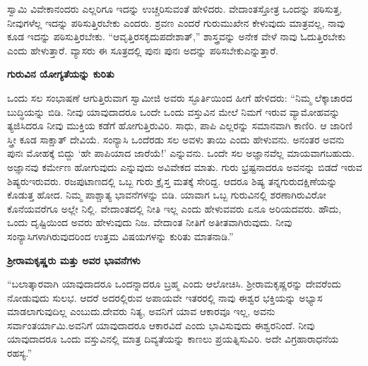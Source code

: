 ಸ್ವಾಮಿ ವಿವೇಕಾನಂದರು ಎಲ್ಲರಿಗೂ ಇದನ್ನು ಉಚ್ಚರಿಸುವಂತೆ ಹೇಳಿದರು. ವೇದಾಂತಸ್ತೋತ್ರ ಒಂದನ್ನು ಪಠಿಸುತ್ತ, ನೀವುಗಳೆಲ್ಲ ಇದನ್ನು ಪಠಿಸುತ್ತಿರಬೇಕು ಎಂದರು. ಶ್ರವಣ ಎಂದರೆ ಗುರುಮುಖೇನ ಕೇಳುವುದು ಮಾತ್ರವಲ್ಲ, ನಾವು ಕೂಡ ಇದನ್ನು ಪಠಿಸುತ್ತಿರಬೇಕು. “ಆವೃತ್ತಿರಸಕೃದುಪದೇಶಾತ್​,” ಶಾಸ್ತ್ರವನ್ನು ಅನೇಕ ವೇಳೆ ನಾವು ಓದುತ್ತಿರಬೇಕು ಎಂದು ಹೇಳುತ್ತಾರೆ. ವ್ಯಾಸರು ಈ ಸೂತ್ರದಲ್ಲಿ ಪುನಃ ಪುನಃ ಅದನ್ನು ಪಠಿಸಬೇಕು\break ಎನ್ನುತ್ತಾರೆ.

\centerline{\textbf{ಗುರುವಿನ ಯೋಗ್ಯತೆಯನ್ನು ಕುರಿತು}}

ಒಂದು ಸಲ ಸಂಭಾಷಣೆ ಆಗುತ್ತಿರುವಾಗ ಸ್ವಾಮೀಜಿ ಅವರು ಸ್ಫೂರ್ತಿಯಿಂದ ಹೀಗೆ ಹೇಳಿದರು: “ನಿಮ್ಮ ಲೆಕ್ಕಾಚಾರದ ಬುದ್ಧಿಯನ್ನು ಬಿಡಿ. ನೀವು ಯಾವುದಾದರೂ ಒಂದೇ ಒಂದು ವಸ್ತುವಿನ ಮೇಲೆ ನಿಮಗೆ ಇರುವ ವ್ಯಾಮೋಹವನ್ನು ತ್ಯಜಿಸಿದರೂ ನೀವು ಮುಕ್ತಿಯ ಕಡೆಗೆ ಹೋಗುತ್ತಿರುವಿರಿ. ಸಾಧು, ಪಾಪಿ ಎಲ್ಲರನ್ನು ಸಮಾನವಾಗಿ ಕಾಣಿರಿ. ಆ ಜಾರಿಣಿ ಸ್ತ್ರೀ ಕೂಡ ಸಾಕ್ಷಾತ್​ ದೇವಿಯೆ. ಸಂನ್ಯಾಸಿ ಒಂದೆರಡು ಸಲ ಅವಳು ತಾಯಿ ಎಂದು ಹೇಳುವನು. ಅನಂತರ ಅವನು ಪುನಃ ಮೋಹಕ್ಕೆ ಬಿದ್ದು ‘ಹೇ ಪಾಪಿಯಾದ ಜಾರೆಯೆ!’ ಎನ್ನುವನು. ಒಂದೇ ಸಲ ಅಜ್ಞಾನವೆಲ್ಲ ಮಾಯವಾಗಬಹುದು. ಅಜ್ಞಾನವು ಕರ್ಮೇಣ ಹೋಗುವುದು ಎನ್ನುವುದು ಅವಿವೇಕದ ಮಾತು. ಗುರು ಭ್ರಷ್ಟನಾದರೂ ಅವನನ್ನು ಬಿಡದೆ ಇರುವ ಶಿಷ್ಯರು\break ಇರುವರು. ರಜಪುಟಾಣದಲ್ಲಿ ಒಬ್ಬ ಗುರು ಕ್ರೈಸ್ತ ಮತಕ್ಕೆ ಸೇರಿದ್ದ. ಆದರೂ ಶಿಷ್ಯ ತನ್ನ\break ಗುರುದಕ್ಷಿಣೆಯನ್ನು ಕೊಡುತ್ತ ಹೋದ. ನಿಮ್ಮ ಪಾಶ್ಚಾತ್ಯ ಭಾವನೆಗಳನ್ನು ಬಿಡಿ. ಯಾವಾಗ ಒಬ್ಬ ಗುರುವಿನಲ್ಲಿ ಶರಣಾಗಿರುವಿರೋ ಕೊನೆಯವರೆಗೂ ಅಲ್ಲೇ ನಿಲ್ಲಿ. ವೇದಾಂತದಲ್ಲಿ ನೀತಿ ಇಲ್ಲ ಎಂದು ಹೇಳುವವರು ಏನೂ ಅರಿಯದವರು. ಹೌದು, ಒಂದು ದೃಷ್ಟಿಯಿಂದ ಅವರು ಹೇಳುವುದು ನಿಜ. ವೇದಾಂತ ನೀತಿಗೆ ಅತೀತವಾಗಿರುವುದು. ನೀವು ಸಂನ್ಯಾಸಿಗಳಾಗಿರುವುದರಿಂದ ಉತ್ತಮ ವಿಷಯಗಳನ್ನು ಕುರಿತು ಮಾತನಾಡಿ.”

\vskip 5pt

\centerline{\textbf{ಶ‍್ರೀರಾಮಕೃಷ್ಣರು ಮತ್ತು ಅವರ ಭಾವನೆಗಳು}}

\vskip 5pt

“ಬಲಾತ್ಕಾರವಾಗಿ ಯಾವುದಾದರೂ ಒಂದನ್ನಾದರೂ ಬ್ರಹ್ಮ ಎಂದು ಆಲೋಚಿಸಿ. ಶ‍್ರೀರಾಮಕೃಷ್ಣರನ್ನು ದೇವರೆಂದು ನೋಡುವುದು ಸುಲಭ. ಆದರೆ ಅದರಲ್ಲಿರುವ ಅಪಾಯವೇ ಇತರರಲ್ಲಿ ನಾವು ಈಶ್ವರ ಭಕ್ತಿಯನ್ನು ಅಭ್ಯಾಸ ಮಾಡಲಾಗುವುದಿಲ್ಲ ಎಂಬುದು.\break ದೇವರು ನಿತ್ಯ, ಅವನಿಗೆ ಯಾವ ಆಕಾರವೂ ಇಲ್ಲ, ಅವನು ಸರ್ವಾಂತರ್ಯಾಮಿ.\break ಅವನಿಗೆ ಯಾವುದಾದರೂ ಆಕಾರವಿದೆ ಎಂದು ಭಾವಿಸುವುದು ಈಶ್ವರನಿಂದೆ. ನೀವು ಯಾವುದಾದರೂ ಒಂದು ವಸ್ತುವಿನಲ್ಲಿ ಮಾತ್ರ ದಿವ್ಯತೆಯನ್ನು ಕಾಣಲು ಪ್ರಯತ್ನಿಸುವಿರಿ. ಅದೇ ವಿಗ್ರಹಾರಾಧನೆಯ ರಹಸ್ಯ.”

\vskip 5pt


